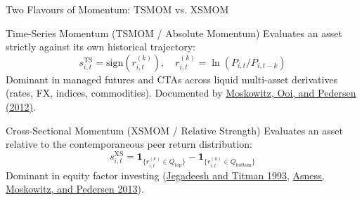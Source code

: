 \documentclass[10pt]{beamer}
\begin{document}
\begin{frame}{Two Flavours of Momentum: TSMOM vs. XSMOM}
  \begin{block}{Time-Series Momentum (TSMOM / Absolute Momentum)}
    Evaluates an asset strictly against its own historical trajectory:
    \begin{equation*}
      s_{i,t}^{\text{TS}} = \text{sign}\left(r_{i,t}^{(k)}\right), \quad r_{i,t}^{(k)} = \ln\left(P_{i,t}/P_{i,t-k}\right)
    \end{equation*}
    Dominant in managed futures and CTAs across liquid multi-asset derivatives (rates, FX, indices, commodities). Documented by \href{https://doi.org/10.1016/j.jfineco.2011.11.003}{Moskowitz, Ooi, and Pedersen (2012)}.
  \end{block}
  \begin{block}{Cross-Sectional Momentum (XSMOM / Relative Strength)}
    Evaluates an asset relative to the contemporaneous peer return distribution:
    \begin{equation*}
      s_{i,t}^{\text{XS}} = \mathbf{1}_{\{r_{i,t}^{(k)} \in Q_{\text{top}}\}} - \mathbf{1}_{\{r_{i,t}^{(k)} \in Q_{\text{bottom}}\}}
    \end{equation*}
    Dominant in equity factor investing (\href{https://doi.org/10.1111/j.1540-6261.1993.tb04702.x}{Jegadeesh and Titman 1993}, \href{https://doi.org/10.1111/jofi.12021}{Asness, Moskowitz, and Pedersen 2013}).
  \end{block}
\end{frame}
\end{document}
